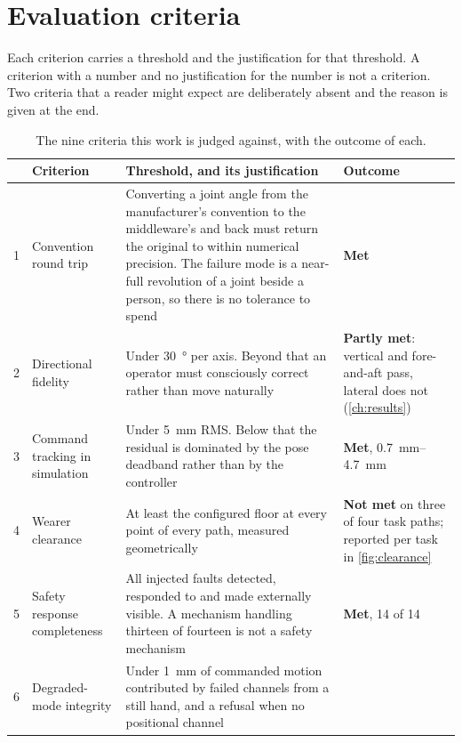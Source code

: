 \chapter{Evaluation criteria}
\label{app:criteria}

Each criterion carries a threshold and the justification for that threshold. A
criterion with a number and no justification for the number is not a
criterion. Two criteria that a reader might expect are deliberately absent and
the reason is given at the end.

\begin{table}[H]
  \centering
  \footnotesize
  \caption[Evaluation criteria]{The nine criteria this work is judged against,
  with the outcome of each.}
  \label{tab:criteria}
  \begin{tabular}{@{}p{5mm}p{28mm}p{58mm}p{38mm}@{}}
    \toprule
    & Criterion & Threshold, and its justification & Outcome \\
    \midrule
    1 & Convention round trip &
      Converting a joint angle from the manufacturer's convention to the
      middleware's and back must return the original to within numerical
      precision. The failure mode is a near-full revolution of a joint beside
      a person, so there is no tolerance to spend &
      \textbf{Met} \\
    2 & Directional fidelity &
      Under \SI{30}{\degree} per axis. Beyond that an operator must
      consciously correct rather than move naturally &
      \textbf{Partly met}: vertical and fore-and-aft pass, lateral does not
      (\cref{ch:results}) \\
    3 & Command tracking in simulation &
      Under \SI{5}{\milli\metre} RMS. Below that the residual is dominated by
      the pose deadband rather than by the controller &
      \textbf{Met}, \SIrange{0.7}{4.7}{\milli\metre} \\
    4 & Wearer clearance &
      At least the configured floor at every point of every path, measured
      geometrically &
      \textbf{Not met} on three of four task paths; reported per task in
      \cref{fig:clearance} \\
    5 & Safety response completeness &
      All injected faults detected, responded to and made externally visible.
      A mechanism handling thirteen of fourteen is not a safety mechanism &
      \textbf{Met}, 14 of 14 \\
    6 & Degraded-mode integrity &
      Under \SI{1}{\milli\metre} of commanded motion contributed by failed
      channels from a still hand, and a refusal when no positional channel

\end{tabular}
\end{table}

